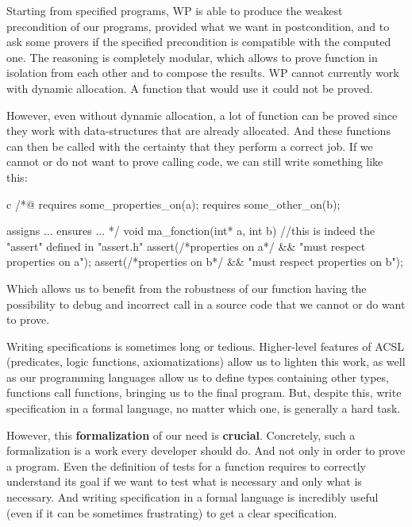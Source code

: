 \documentclass[middle]{zmdocument}
\begin{document}
Starting from specified programs, WP is able to produce the weakest
precondition of our programs, provided what we want in postcondition,
and to ask some provers if the specified precondition is compatible with
the computed one. The reasoning is completely modular, which allows to
prove function in isolation from each other and to compose the results.
WP cannot currently work with dynamic allocation. A function that would
use it could not be proved.

However, even without dynamic allocation, a lot of function can be
proved since they work with data-structures that are already allocated.
And these functions can then be called with the certainty that they
perform a correct job. If we cannot or do not want to prove calling
code, we can still write something like this:



\begin{CodeBlock}{c}
/*@
  requires some_properties_on(a);
  requires some_other_on(b);

  assigns ...
  ensures ...
*/
void ma_fonction(int* a, int b){
  //this is indeed the  "assert" defined in "assert.h"
  assert(/*properties on a*/ && "must respect properties on a");  
  assert(/*properties on b*/ && "must respect properties on b");
}
\end{CodeBlock}



Which allows us to benefit from the robustness of our function having
the possibility to debug and incorrect call in a source code that we
cannot or do want to prove.

Writing specifications is sometimes long or tedious. Higher-level
features of ACSL (predicates, logic functions, axiomatizations) allow us
to lighten this work, as well as our programming languages allow us to
define types containing other types, functions call functions, bringing
us to the final program. But, despite this, write specification in a
formal language, no matter which one, is generally a hard task.

However, this \textbf{formalization} of our need is \textbf{crucial}.
Concretely, such a formalization is a work every developer should do.
And not only in order to prove a program. Even the definition of tests
for a function requires to correctly understand its goal if we want to
test what is necessary and only what is necessary. And writing
specification in a formal language is incredibly useful (even if it can
be sometimes frustrating) to get a clear specification.
\end{document}
